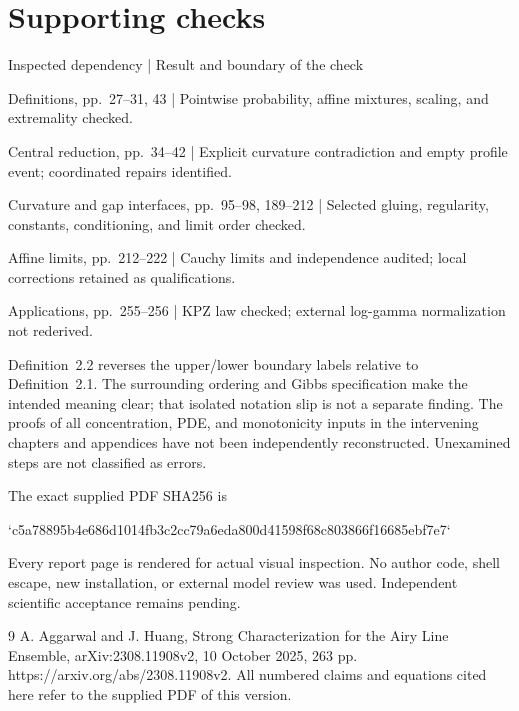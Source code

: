 \documentclass[10pt]{article}
\begin{document}
\section*{Supporting checks}
Inspected dependency | Result and boundary of the check\par
Definitions, pp. 27–31, 43 | Pointwise probability, affine mixtures, scaling, and extremality checked.\par
Central reduction, pp. 34–42 | Explicit curvature contradiction and empty profile event; coordinated repairs identified.\par
Curvature and gap interfaces, pp. 95–98, 189–212 | Selected gluing, regularity, constants, conditioning, and limit order checked.\par
Affine limits, pp. 212–222 | Cauchy limits and independence audited; local corrections retained as qualifications.\par
Applications, pp. 255–256 | KPZ law checked; external log-gamma normalization not rederived.\par
Definition 2.2 reverses the upper/lower boundary labels relative to Definition 2.1. The surrounding ordering and Gibbs specification make the intended meaning clear; that isolated notation slip is not a separate finding. The proofs of all concentration, PDE, and monotonicity inputs in the intervening chapters and appendices have not been independently reconstructed. Unexamined steps are not classified as errors.\par
The exact supplied PDF SHA256 is\par
`c5a78895b4e686d1014fb3c2cc79a6eda800d41598f68c803866f16685ebf7e7`\par
Every report page is rendered for actual visual inspection. No author code, shell escape, new installation, or external model review was used. Independent scientific acceptance remains pending.\par
9 A. Aggarwal and J. Huang, Strong Characterization for the Airy Line Ensemble, arXiv:2308.11908v2, 10 October 2025, 263 pp. https://arxiv.org/abs/2308.11908v2. All numbered claims and equations cited here refer to the supplied PDF of this version.\par
\end{document}

